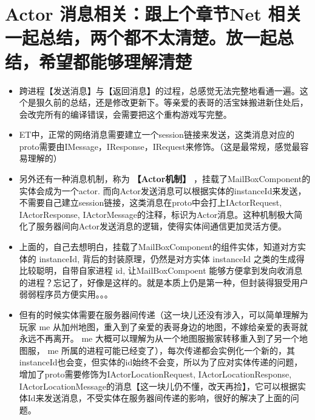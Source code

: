 \documentclass[9pt, b5paper]{article}
\begin{document}
\section{Actor 消息相关：跟上个章节Net 相关一起总结，两个都不太清楚。放一起总结，希望都能够理解清楚}
\label{sec-2}
\begin{itemize}
\item 跨进程【发送消息】与【返回消息】的过程，总感觉无法完整地看通一遍。这个是狠久前的总结，还是修改更新下。等亲爱的表哥的活宝妹搬进新住处后，会改完所有的编译错误，会需要把这个重构游戏写完整。
\item ET中，正常的网络消息需要建立一个session链接来发送，这类消息对应的proto需要由IMessage，IResponse，IRequest来修饰。（这是最常规，感觉最容易理解的）
\item 另外还有一种消息机制，称为 \textbf{【Actor机制】} ，挂载了MailBoxComponent的实体会成为一个actor. 而向Actor发送消息可以根据实体的instanceId来发送，不需要自己建立session链接，这类消息在proto中会打上IActorRequest, IActorResponse, IActorMessage的注释，标识为Actor消息。这种机制极大简化了服务器间向Actor发送消息的逻辑，使得实体间通信更加灵活方便。
\item 上面的，自己去想明白，挂载了MailBoxComponent的组件实体，知道对方实体的 instanceId, 背后的封装原理，仍然是对方实体 instanceId 之类的生成得比较聪明，自带自家进程 id, 让MailBoxCompoent 能够方便拿到发向收消息的进程？忘记了，好像是这样的。就是本质上仍是第一种，但封装得狠受用户弱弱程序员方便实用。。。
\item 但有的时候实体需要在服务器间传递（这一块儿还没有涉入，可以简单理解为玩家 me 从加州地图，重入到了亲爱的表哥身边的地图，不嫁给亲爱的表哥就永远不再离开。 me 大概可以理解为从一个地图服搬家转移重入到了另一个地图服， me 所属的进程可能已经变了），每次传递都会实例化一个新的，其instanceId也会变，但实体的id始终不会变，所以为了应对实体传递的问题，增加了proto需要修饰为IActorLocationRequest, IActorLocationResponse, IActorLocationMessage的消息【这一块儿仍不懂，改天再捡】，它可以根据实体Id来发送消息，不受实体在服务器间传递的影响，很好的解决了上面的问题。
\end{itemize}
\end{document}
